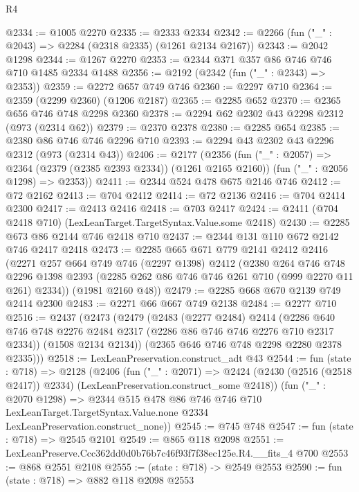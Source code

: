 \begin{lexlean}{R4}
\begin{coremodule}
@2334 := @1005 @2270
@2335 := @2333 @2334
@2342 := @2266 (fun ("_" : @2043) => @2284 (@2318 @2335) (@1261 @2134 @2167))
@2343 := @2042 @1298
@2344 := @1267 @2270
@2353 := @2344 @371 @357 @86 @746 @746 @710 @1485 @2334 @1488
@2356 := @2192 (@2342 (fun ("_" : @2343) => @2353))
@2359 := @2272 @657 @749 @746
@2360 := @2297 @710
@2364 := @2359 (@2299 @2360) (@1206 @2187)
@2365 := @2285 @652
@2370 := @2365 @656 @746 @748 @2298 @2360
@2378 := @2294 @62 @2302 @43 @2298 @2312 (@973 (@2314 @62))
@2379 := @2370 @2378
@2380 := @2285 @654
@2385 := @2380 @86 @746 @746 @2296 @710
@2393 := @2294 @43 @2302 @43 @2296 @2312 (@973 (@2314 @43))
@2406 := @2177
    (@2356
      (fun ("_" : @2057) => @2364 (@2379 (@2385 @2393 @2334)) (@1261 @2165 @2160))
      (fun ("_" : @2056 @1298) => @2353))
@2411 := @2344 @524 @478 @675 @2146 @746
@2412 := @72 @2162
@2413 := @704 @2412
@2414 := @72 @2136
@2416 := @704 @2414 @2300
@2417 := @2413 @2416
@2418 := @703 @2417
@2424 := @2411 (@704 @2418 @710) (LexLeanTarget.TargetSyntax.Value.some @2418)
@2430 := @2285 @673 @86 @2144 @746 @2418 @710
@2437 := @2344 @131 @110 @672 @2142 @746 @2417 @2418
@2473 := @2285
    @665
    @671
    @779
    @2141
    @2412
    @2416
    (@2271
      @257
      @664
      @749
      @746
      (@2297 @1398)
      @2412
      (@2380
        @264
        @746
        @748
        @2296
        @1398
        @2393
        (@2285 @262 @86 @746 @746 @261 @710 (@999 @2270 @11 @261) @2334))
      (@1981 @2160 @48))
@2479 := @2285 @668 @670 @2139 @749 @2414 @2300
@2483 := @2271 @66 @667 @749 @2138
@2484 := @2277 @710
@2516 := @2437
    (@2473
      (@2479
        (@2483
          (@2277 @2484)
          @2414
          (@2286 @640 @746 @748 @2276 @2484 @2317 (@2286 @86 @746 @746 @2276 @710 @2317 @2334))
          (@1508 @2134 @2134))
        (@2365 @646 @746 @748 @2298 @2280 @2378 @2335)))
@2518 := LexLeanPreservation.construct_adt @43
@2544 := fun (state : @718) =>
  @2128
    (@2406
      (fun ("_" : @2071) =>
      @2424 (@2430 (@2516 (@2518 @2417)) @2334) (LexLeanPreservation.construct_some @2418))
      (fun ("_" : @2070 @1298) =>
      @2344
        @515
        @478
        @86
        @746
        @746
        @710
        LexLeanTarget.TargetSyntax.Value.none
        @2334
        LexLeanPreservation.construct_none))
@2545 := @745 @748
@2547 := fun (state : @718) => @2545 @2101
@2549 := @865 @118 @2098
@2551 := LexLeanPreserve.Ccc362dd0d0b76b7c46f93f7f38ec125e.R4.__fits_4 @700
@2553 := @868 @2551 @2108
@2555 := (state : @718) -> @2549 @2553
@2590 := fun (state : @718) =>
  @882
    @118
    @2098
    @2553

\end{coremodule}
\end{lexlean}
